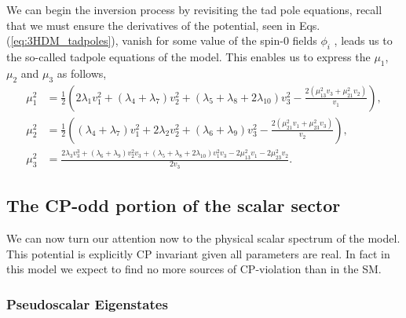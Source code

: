 We can begin the inversion process by revisiting the tad pole equations, recall that we must ensure the derivatives of the potential, seen in Eqs.\,(\ref{eq:3HDM_tadpoles}), vanish for some value of the spin-0 fields $\phi_i$ , leads us to the so-called tadpole equations of the model. This enables us to express the $\mu_1$, $\mu_2$ and $\mu_3$ as follows, 
%
\begin{equation}
\label{eq:3HDM_Param_1}
\begin{split}
%
\mu _1^2& =\frac{1}{2} \left(2 \lambda _1 v_1^2+\left(\lambda _4+\lambda _7\right) v_2^2+\left(\lambda _5+\lambda _8+2 \lambda _{10}\right) v_3^2-\frac{2 \left(\mu _{13}^2 v_3+\mu _{21}^2
   v_2\right)}{v_1}\right) , \\ 
%
\mu _2^2 & =\frac{1}{2} \left(\left(\lambda _4+\lambda _7\right) v_1^2+2 \lambda _2 v_2^2+\left(\lambda _6+\lambda _9\right) v_3^2-\frac{2 \left(\mu _{21}^2 v_1+\mu _{23}^2 v_3\right)}{v_2}\right)  , \\ 
% 
\mu _3^2 & =\frac{2 \lambda _3 v_3^3+\left(\lambda _6+\lambda _9\right) v_2^2 v_3+\left(\lambda _5+\lambda _8+2 \lambda _{10}\right) v_1^2 v_3-2 \mu _{13}^2 v_1-2 \mu _{23}^2 v_2}{2 v_3} . 
\end{split}  
\end{equation}

\subsection{The CP-odd portion of the scalar sector}

We can now turn our attention now to the physical scalar spectrum of the model. 
%
This potential is explicitly CP invariant given all parameters are real.
%
In fact in this model we expect to find no more sources of CP-violation than in the SM. 

\subsubsection{Pseudoscalar Eigenstates}


